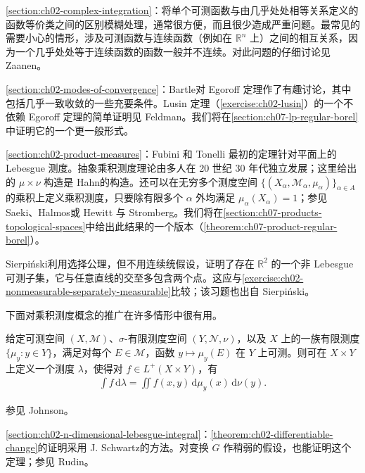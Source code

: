 \documentclass[../../main.tex]{subfiles}%
\begin{document}
\cref{section:ch02-complex-integration}：将单个可测函数与由几乎处处相等关系定义的函数等价类之间的区别模糊处理，通常很方便，而且很少造成严重问题。最常见的需要小心的情形，涉及可测函数与连续函数（例如在 $\mathbb{R}^n$ 上）之间的相互关系，因为一个几乎处处等于连续函数的函数一般并不连续。对此问题的仔细讨论见 Zaanen\cite{folland-bib-165}。

\cref{section:ch02-modes-of-convergence}：Bartle\cite{folland-bib-012}对 Egoroff 定理作了有趣讨论，其中包括几乎一致收敛的一些充要条件。Lusin 定理（\cref{exercise:ch02-lusin}）的一个不依赖 Egoroff 定理的简单证明见 Feldman\cite{folland-bib-043}。我们将在\cref{section:ch07-lp-regular-borel}中证明它的一个更一般形式。

\cref{section:ch02-product-measures}：Fubini 和 Tonelli 最初的定理针对平面上的 Lebesgue 测度。抽象乘积测度理论由多人在 20 世纪 30 年代独立发展；这里给出的 $\mu\times\nu$ 构造是 Hahn\cite{folland-bib-060}的构造。还可以在无穷多个测度空间 $\{(X_\alpha,\mathscr{M}_\alpha,\mu_\alpha)\}_{\alpha\in A}$ 的乘积上定义乘积测度，只要除有限多个 $\alpha$ 外均满足 $\mu_\alpha(X_\alpha)=1$；参见 Saeki\cite{folland-bib-127}、Halmos\cite[\S38]{folland-bib-061}或 Hewitt 与 Stromberg\cite[\S22]{folland-bib-076}。我们将在\cref{section:ch07-products-topological-spaces}中给出此结果的一个版本（\cref{theorem:ch07-product-regular-borel}）。

Sierpiński\cite{folland-bib-134}利用选择公理，但不用连续统假设，证明了存在 $\mathbb{R}^2$ 的一个非 Lebesgue 可测子集，它与任意直线的交至多包含两个点。这应与\cref{exercise:ch02-nonmeasurable-separately-measurable}比较；该习题也出自 Sierpiński。

下面对乘积测度概念的推广在许多情形中很有用。
\begin{proposition}\label{proposition:ch02-generalized-product-measure}
给定可测空间 $(X,\mathscr{M})$、$\sigma$-有限测度空间 $(Y,\mathscr{N},\nu)$，以及 $X$ 上的一族有限测度 $\{\mu_y:y\in Y\}$，满足对每个 $E\in\mathscr{M}$，函数 $y\mapsto\mu_y(E)$ 在 $Y$ 上可测。则可在 $X\times Y$ 上定义一个测度 $\lambda$，使得对 $f\in L^+(X\times Y)$，有
\begin{align*}
\int f\,\mathrm{d}\lambda=\iint f(x,y)\,\mathrm{d}\mu_y(x)\,\mathrm{d}\nu(y).
\end{align*}
\end{proposition}
参见 Johnson\cite{folland-bib-079}。

\cref{section:ch02-n-dimensional-lebesgue-integral}：\cref{theorem:ch02-differentiable-change}的证明采用 J. Schwartz\cite{folland-bib-131}的方法。对变换 $G$ 作稍弱的假设，也能证明这个定理；参见 Rudin\cite[定理 7.26]{folland-bib-125}。
\end{document}
